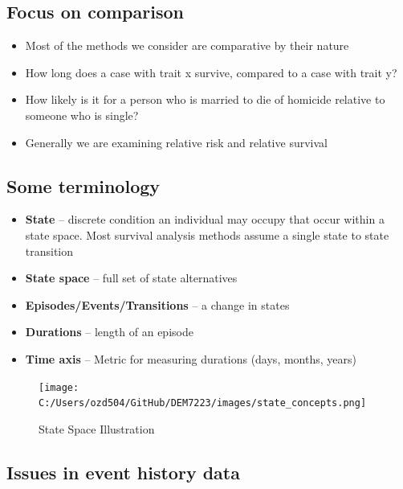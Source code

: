 \documentclass[
  letterpaper,
  DIV=11,
  numbers=noendperiod]{scrreprt}
\providecommand{\tightlist}{%
  \setlength{\itemsep}{0pt}\setlength{\parskip}{0pt}}\usepackage{longtable,booktabs,array}
\begin{document}
\hypertarget{focus-on-comparison}{%
\subsection{Focus on comparison}\label{focus-on-comparison}}

\begin{itemize}
\tightlist
\item
  Most of the methods we consider are comparative by their nature
\item
  How long does a case with trait x survive, compared to a case with
  trait y?
\item
  How likely is it for a person who is married to die of homicide
  relative to someone who is single?
\item
  Generally we are examining relative risk and relative survival
\end{itemize}

\hypertarget{some-terminology}{%
\subsection{Some terminology}\label{some-terminology}}

\begin{itemize}
\tightlist
\item
  \textbf{State} -- discrete condition an individual may occupy that
  occur within a state space. Most survival analysis methods assume a
  single state to state transition
\item
  \textbf{State space} -- full set of state alternatives
\item
  \textbf{Episodes/Events/Transitions} -- a change in states
\item
  \textbf{Durations} -- length of an episode
\item
  \textbf{Time axis} -- Metric for measuring durations (days, months,
  years)
\end{itemize}

\begin{figure}

{\centering \texttt{[image: C:/Users/ozd504/GitHub/DEM7223/images/state\_concepts.png]}

}

\caption{State Space Illustration}

\end{figure}

\hypertarget{issues-in-event-history-data}{%
\subsection{Issues in event history
data}\label{issues-in-event-history-data}}
\end{document}
